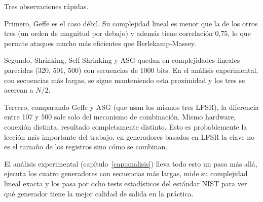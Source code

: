 Tres observaciones rápidas.

Primero, Geffe es el caso débil. Su complejidad lineal es menor que la de los otros tres (un orden de magnitud por debajo) y además tiene correlación 0,75,
lo que permite ataques mucho más eficientes que Berlekamp-Massey.

Segundo, Shrinking, Self-Shrinking y ASG quedan en complejidades lineales parecidas (320, 501, 500) con secuencias de 1000 bits.
En el análisis experimental, con secuencias más largas, se sigue manteniendo esta proximidad y los tres se acercan a $N/2$.

Tercero, comparando Geffe y ASG (que usan los mismos tres LFSR), la diferencia entre 107 y 500 sale solo del mecanismo de combinación.
Mismo hardware, conexión distinta, resultado completamente distinto. Esto es probablemente la lección más importante del trabajo,
en generadores basados en LFSR la clave no es el tamaño de los registros sino cómo se combinan.

El análisis experimental (capítulo~\ref{cap:analisis}) lleva todo esto un paso más allá, ejecuta los cuatro generadores con secuencias más largas, mide su complejidad lineal exacta
y los pasa por ocho tests estadísticos del estándar NIST para ver qué generador tiene la mejor calidad de salida en la práctica.
